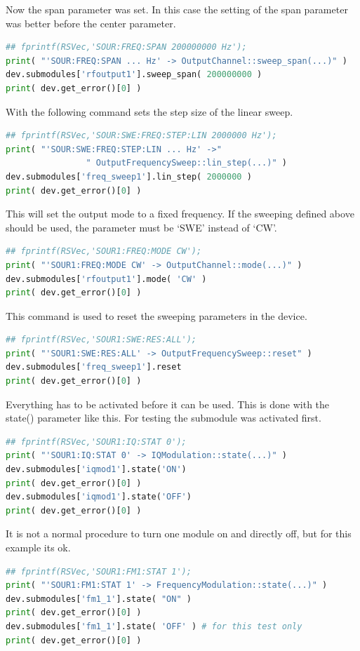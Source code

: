 \documentclass[11pt]{article} %
\begin{document}
Now the span parameter was set. In this case the setting of the span parameter was better before the center parameter.
\begin{lstlisting}[frame=single, language=Python]
## fprintf(RSVec,'SOUR:FREQ:SPAN 200000000 Hz');
print( "'SOUR:FREQ:SPAN ... Hz' -> OutputChannel::sweep_span(...)" )
dev.submodules['rfoutput1'].sweep_span( 200000000 )
print( dev.get_error()[0] )
\end{lstlisting}

With the following command sets the step size of the linear sweep.
\begin{lstlisting}[frame=single, language=Python]
## fprintf(RSVec,'SOUR:SWE:FREQ:STEP:LIN 2000000 Hz');
print( "'SOUR:SWE:FREQ:STEP:LIN ... Hz' ->"
				" OutputFrequencySweep::lin_step(...)" )
dev.submodules['freq_sweep1'].lin_step( 2000000 )
print( dev.get_error()[0] )
\end{lstlisting}

This will set the output mode to a fixed frequency. If the sweeping defined above should be used, the parameter must be `SWE' instead of `CW'.
\begin{lstlisting}[frame=single, language=Python]
## fprintf(RSVec,'SOUR1:FREQ:MODE CW');
print( "'SOUR1:FREQ:MODE CW' -> OutputChannel::mode(...)" )
dev.submodules['rfoutput1'].mode( 'CW' )
print( dev.get_error()[0] )
\end{lstlisting}

This command is used to reset the sweeping parameters in the device.
\begin{lstlisting}[frame=single, language=Python]
## fprintf(RSVec,'SOUR1:SWE:RES:ALL');
print( "'SOUR1:SWE:RES:ALL' -> OutputFrequencySweep::reset" )
dev.submodules['freq_sweep1'].reset
print( dev.get_error()[0] )
\end{lstlisting}

Everything has to be activated before it can be used. This is done with the state() parameter like this. For testing the submodule was activated first.
\begin{lstlisting}[frame=single, language=Python]
## fprintf(RSVec,'SOUR1:IQ:STAT 0');
print( "'SOUR1:IQ:STAT 0' -> IQModulation::state(...)" )
dev.submodules['iqmod1'].state('ON')
print( dev.get_error()[0] )
dev.submodules['iqmod1'].state('OFF')
print( dev.get_error()[0] )
\end{lstlisting}

It is not a normal procedure to turn one module on and directly off, but for this example its ok.
\begin{lstlisting}[frame=single, language=Python]
## fprintf(RSVec,'SOUR1:FM1:STAT 1');
print( "'SOUR1:FM1:STAT 1' -> FrequencyModulation::state(...)" )
dev.submodules['fm1_1'].state( "ON" )
print( dev.get_error()[0] )
dev.submodules['fm1_1'].state( 'OFF' ) # for this test only
print( dev.get_error()[0] )
\end{lstlisting}
\end{document}
